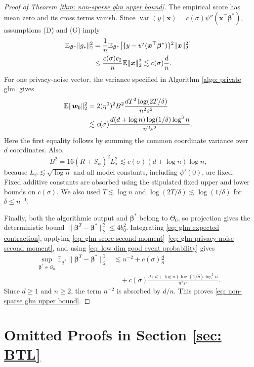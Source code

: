 \documentclass[letterpaper,12pt]{article}
\numberwithin{equation}{section}
\theoremstyle{plain}
\numberwithin{Theorem}{section}
\numberwithin{proposition}{section}
\numberwithin{Lemma}{section}
{
	\theoremstyle{definition}
	\newtheorem{Definition}{Definition}
	\newtheorem{example}{Example}
	\numberwithin{example}{section}
	\newtheorem{fact}{Fact}
	\numberwithin{fact}{section}
	\newtheorem{remark}{Remark}
}
\newcommand{\1}{\mathbbm{1}}
\def\bbeta{{\boldsymbol{\beta}}}
\def\E{\mathbb{E}}
\begin{document}
{\begin{proof}[Proof of Theorem \ref{thm: non-sparse glm upper bound}]
	The empirical score has mean zero and its cross terms vanish.  Since
	$\operatorname{var}(y\mid\bm x)=c(\sigma)\psi''(\bm x^\top\bbeta^*)$, assumptions (D) and (G) imply
	\begin{align}\label{eq: glm score second moment}
	\E_{\bbeta^*}\|g_*\|_2^2
	&=\frac1n\E_{\bbeta^*}\!\left[
	\{y-\psi'(\bm x^\top\bbeta^*)\}^2\|\bm x\|_2^2\right]\\
	&\leq \frac{c(\sigma)c_2}{n}\E\|\bm x\|_2^2
	\lesssim c(\sigma)\frac dn.\notag
	\end{align}
	For one privacy-noise vector, the variance specified in Algorithm \ref{algo: private glm} gives
	\begin{align}\label{eq: glm privacy noise second moment}
	\E\|\bm w_0\|_2^2
	&=2(\eta^0)^2B^2\frac{dT^2\log(2T/\delta)}
	{n^2\varepsilon^2}\\
	&\lesssim c(\sigma)
	\frac{d(d+\log n)\log(1/\delta)\log^3 n}
	{n^2\varepsilon^2}.\notag
	\end{align}
	Here the first equality follows by summing the common coordinate
	variance over \(d\) coordinates.  Also,
	\[
	B^2=16(R+S_\psi)^2L_{\bm x}^2
	\lesssim c(\sigma)(d+\log n)\log n,
	\]
	because $L_\psi\lesssim\sqrt{\log n}$ and all model constants,
	including $\psi'(0)$, are fixed. Fixed additive constants are absorbed
	using the stipulated fixed upper and lower bounds on \(c(\sigma)\). We
	also used
	$T\lesssim\log n$ and
	$\log(2T/\delta)\lesssim\log(1/\delta)$ for $\delta\leq n^{-1}$.

	Finally, both the algorithmic output and \(\bbeta^*\) belong to
	\(\Theta_0\), so projection gives the deterministic bound
	$\|\bbeta^T-\bbeta^*\|_2^2\leq4b_0^2$.  Integrating
	\eqref{eq: glm expected contraction}, applying
	\eqref{eq: glm score second moment}--\eqref{eq: glm privacy noise second moment}, and using \eqref{eq: low dim good event probability} gives
	\begin{align*}
	\sup_{\bbeta^*\in\Theta_0}\E_{\bbeta^*}
	\|\bbeta^T-\bbeta^*\|_2^2
	&\lesssim n^{-2}+c(\sigma)\frac dn\\
	&\quad+c(\sigma)
	\frac{d(d+\log n)\log(1/\delta)\log^3 n}
	{n^2\varepsilon^2}.
	\end{align*}
	Since \(d\geq1\) and \(n\geq2\), the term \(n^{-2}\) is absorbed
	by \(d/n\).  This proves \eqref{eq: non-sparse glm upper bound}.
\end{proof}}

\section{Omitted Proofs in Section \ref{sec: BTL}}\label{sec: BTL proofs}
\end{document}
